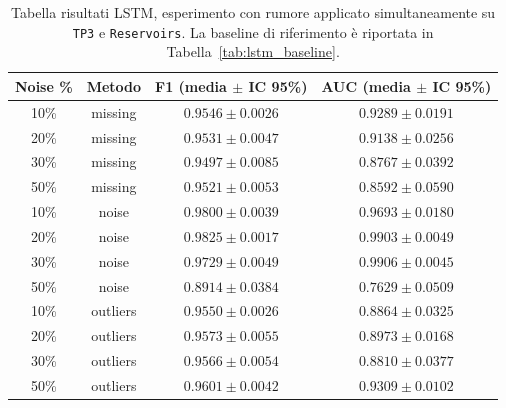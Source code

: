 \documentclass[../main.tex]{subfiles}
\begin{document}
\begin{table}[H]
\centering\small
{}
\begin{tabular}{cccc}
\toprule
\textbf{Noise \%} & \textbf{Metodo} & \textbf{F1 (media $\pm$ IC 95\%)} & \textbf{AUC (media $\pm$ IC 95\%)} \\
\midrule
10\% & missing  & $0.9546 \pm 0.0026$ & $0.9289 \pm 0.0191$ \\
20\% & missing  & $0.9531 \pm 0.0047$ & $0.9138 \pm 0.0256$ \\
30\% & missing  & $0.9497 \pm 0.0085$ & $0.8767 \pm 0.0392$ \\
50\% & missing  & $0.9521 \pm 0.0053$ & $0.8592 \pm 0.0590$ \\
\midrule
10\% & noise    & $0.9800 \pm 0.0039$ & $0.9693 \pm 0.0180$ \\
20\% & noise    & $0.9825 \pm 0.0017$ & $0.9903 \pm 0.0049$ \\
30\% & noise    & $0.9729 \pm 0.0049$ & $0.9906 \pm 0.0045$ \\
50\% & noise    & $0.8914 \pm 0.0384$ & $0.7629 \pm 0.0509$ \\
\midrule
10\% & outliers & $0.9550 \pm 0.0026$ & $0.8864 \pm 0.0325$ \\
20\% & outliers & $0.9573 \pm 0.0055$ & $0.8973 \pm 0.0168$ \\
30\% & outliers & $0.9566 \pm 0.0054$ & $0.8810 \pm 0.0377$ \\
50\% & outliers & $0.9601 \pm 0.0042$ & $0.9309 \pm 0.0102$ \\
\bottomrule
\end{tabular}
\caption{Tabella risultati LSTM, esperimento con rumore applicato
simultaneamente su \texttt{TP3} e \texttt{Reservoirs}.
La baseline di riferimento è riportata in Tabella~\ref{tab:lstm_baseline}.}
\label{tab:lstm_new_tp3_reservoir}
\end{table}
\newpage
\end{document}

